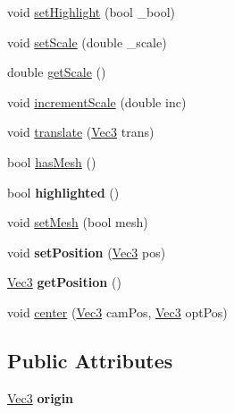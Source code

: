 \begin{DoxyCompactItemize}
\item 
void \hyperlink{classGraphicalObject_abc3ff1ef131db3b36c40ae04d533daa3}{setHighlight} (bool \_\-bool)
\item 
void \hyperlink{classGraphicalObject_a304ff62328d4ced89fbb88951ca2f355}{setScale} (double \_\-scale)
\item 
double \hyperlink{classGraphicalObject_a266b270672c4da50c47bbd4cee7008e8}{getScale} ()
\item 
void \hyperlink{classGraphicalObject_a2d01a90fa8d7aa54a02e07d9e33eb993}{incrementScale} (double inc)
\item 
void \hyperlink{classGraphicalObject_a6582fd399673a5bd5dfcdbad00ff1966}{translate} (\hyperlink{structVec3}{Vec3} trans)
\item 
bool \hyperlink{classGraphicalObject_a99b117674c1de60cac36eadd5be3ff3f}{hasMesh} ()
\item 
\hypertarget{classGraphicalObject_acc1ff1412cf90e11b323bc0396f80534}{
bool {\bfseries highlighted} ()}
\label{classGraphicalObject_acc1ff1412cf90e11b323bc0396f80534}

\item 
void \hyperlink{classGraphicalObject_a499bbe0e9c9bc5bcff08465f97b60776}{setMesh} (bool mesh)
\item 
\hypertarget{classGraphicalObject_a13bf38db47440924c2cfa2eae0bbde07}{
void {\bfseries setPosition} (\hyperlink{structVec3}{Vec3} pos)}
\label{classGraphicalObject_a13bf38db47440924c2cfa2eae0bbde07}

\item 
\hypertarget{classGraphicalObject_a12144c8a86ff8b531d6caeae19f95ea4}{
\hyperlink{structVec3}{Vec3} {\bfseries getPosition} ()}
\label{classGraphicalObject_a12144c8a86ff8b531d6caeae19f95ea4}

\item 
void \hyperlink{classGraphicalObject_abd9b4745450b888e825420c534a7555f}{center} (\hyperlink{structVec3}{Vec3} camPos, \hyperlink{structVec3}{Vec3} optPos)
\end{DoxyCompactItemize}
\subsection*{Public Attributes}
\begin{DoxyCompactItemize}
\item 
\hypertarget{classGraphicalObject_a78331fe745cd3eb10ed1d10594cc2293}{
\hyperlink{structVec3}{Vec3} {\bfseries origin}}
\label{classGraphicalObject_a78331fe745cd3eb10ed1d10594cc2293}

\end{DoxyCompactItemize}


